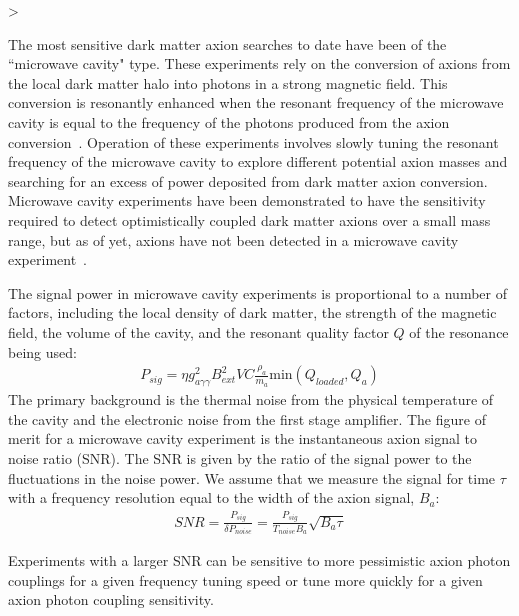 >\documentclass[aps,prl,twocolumn,groupedaddress]{revtex4-1}
\begin{document}
The most sensitive dark matter axion searches to date have been of the ``microwave cavity" type.
These experiments rely on the conversion of axions from the local dark matter halo into photons in a strong magnetic field.
This conversion is resonantly enhanced when the resonant frequency of the microwave cavity is equal to the frequency of the photons produced from the axion conversion~\cite{PhysRevLett.51.1415}.
Operation of these experiments involves slowly tuning the resonant frequency of the microwave cavity to explore different potential axion masses and searching for an excess of power deposited from dark matter axion conversion.
Microwave cavity experiments have been demonstrated to have the sensitivity required to detect optimistically coupled dark matter axions over a small mass range,
but as of yet, axions have not been detected in a microwave cavity experiment~\cite{PhysRevLett.104.041301}.

The signal power in microwave cavity experiments is proportional to a number of factors, including the local density of dark matter, the strength of the magnetic field, the volume of the cavity, and the resonant 
quality factor $Q$ of the resonance being used:
\begin{align}
P_{sig} = \eta g_{a\gamma\gamma}^2B_{ext}^2VC\frac{\rho_a}{m_a}\text{min}(Q_{loaded},Q_a)
\end{align}
The primary background is the thermal noise from the physical temperature of the cavity and the electronic noise from the first stage amplifier.  
The figure of merit for a microwave cavity experiment is the instantaneous axion signal to noise ratio (SNR).
The SNR is given by the ratio of the signal power to the fluctuations in the noise power. We assume that we measure the signal for time $\tau$ with a frequency resolution equal to the width of the axion signal, $B_a$:
\begin{align}
SNR = \frac{P_{sig}}{\delta P_{noise}} = \frac{P_{sig}}{T_{noise}B_a}\sqrt{B_a \tau}
\end{align}

Experiments with a larger SNR can be sensitive to more pessimistic axion photon couplings for a given frequency tuning speed or tune more quickly for a given axion photon coupling sensitivity.
\end{document}
